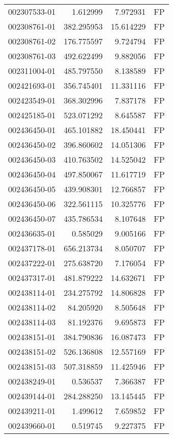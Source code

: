 \begin{tabular}{lrrl}
002307533-01 &    1.612999 &     7.972931 &   FP \\
002308761-01 &  382.295953 &    15.614229 &   FP \\
002308761-02 &  176.775597 &     9.724794 &   FP \\
002308761-03 &  492.622499 &     9.882056 &   FP \\
002311004-01 &  485.797550 &     8.138589 &   FP \\
002421693-01 &  356.745401 &    11.331116 &   FP \\
002423549-01 &  368.302996 &     7.837178 &   FP \\
002425185-01 &  523.071292 &     8.645587 &   FP \\
002436450-01 &  465.101882 &    18.450441 &   FP \\
002436450-02 &  396.860602 &    14.051306 &   FP \\
002436450-03 &  410.763502 &    14.525042 &   FP \\
002436450-04 &  497.850067 &    11.617719 &   FP \\
002436450-05 &  439.908301 &    12.766857 &   FP \\
002436450-06 &  322.561115 &    10.325776 &   FP \\
002436450-07 &  435.786534 &     8.107648 &   FP \\
002436635-01 &    0.585029 &     9.005166 &   FP \\
002437178-01 &  656.213734 &     8.050707 &   FP \\
002437222-01 &  275.638720 &     7.176054 &   FP \\
002437317-01 &  481.879222 &    14.632671 &   FP \\
002438114-01 &  234.275792 &    14.806828 &   FP \\
002438114-02 &   84.205920 &     8.505648 &   FP \\
002438114-03 &   81.192376 &     9.695873 &   FP \\
002438151-01 &  384.790836 &    16.087473 &   FP \\
002438151-02 &  526.136808 &    12.557169 &   FP \\
002438151-03 &  507.318859 &    11.425946 &   FP \\
002438249-01 &    0.536537 &     7.366387 &   FP \\
002439144-01 &  284.288250 &    13.145445 &   FP \\
002439211-01 &    1.499612 &     7.659852 &   FP \\
002439660-01 &    0.519745 &     9.227375 &   FP \\

\end{tabular}
